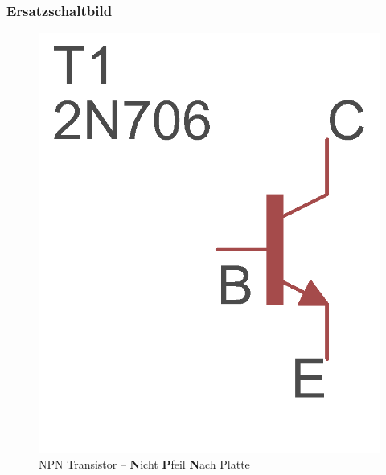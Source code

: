 \begin{frame}
  \frametitle{Ersatzschaltbild}

  \begin{minipage}{0.4\textwidth}
    \begin{figure}
      \includegraphics[width=\textwidth,height=.4\textheight,keepaspectratio]{e13/NPN.png}
      \caption{NPN Transistor -- \textbf{N}icht \textbf{P}feil \textbf{N}ach Platte}
    \end{figure}
  \end{minipage}
  \hspace{0.5cm}
  \begin{minipage}{0.4\textwidth}
    \begin{figure}

\end{figure}
\end{minipage}
\end{frame}

